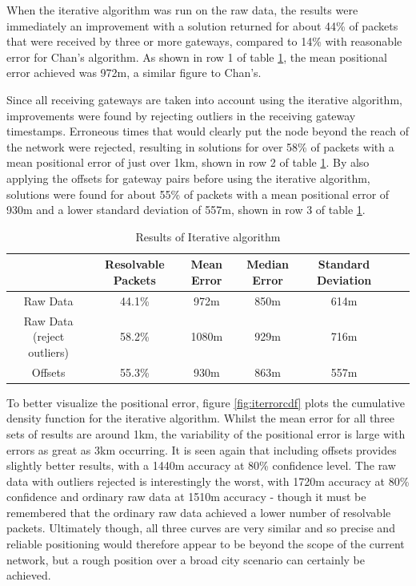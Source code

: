 \documentclass[a4paper]{report}
\begin{document}
    When the iterative algorithm was run on the raw data, the results were immediately an improvement with a solution returned for about 44\% of packets that were received by three or more gateways, compared to 14\% with reasonable error for Chan's algorithm. As shown in row 1 of table \ref{tab:iterresults}, the mean positional error achieved was 972m, a similar figure to Chan's.

    Since all receiving gateways are taken into account using the iterative algorithm, improvements were found by rejecting outliers in the receiving gateway timestamps. Erroneous times that would clearly put the node beyond the reach of the network were rejected, resulting in solutions for over 58\% of packets with a mean positional error of just over 1km, shown in row 2 of table \ref{tab:iterresults}. By also applying the offsets for gateway pairs before using the iterative algorithm, solutions were found for about 55\% of packets with a mean positional error of 930m and a lower standard deviation of 557m, shown in row 3 of table \ref{tab:iterresults}.

    \begin{table}[ht]
      \begin{center}
        \caption{Results of Iterative algorithm}
        \label{tab:iterresults}
        \begin{tabular}{|c|c|c|c|c|c|c|}
          \hline
           & Resolvable Packets & Mean Error & Median Error & Standard Deviation \\
          \hline
          Raw Data & 44.1\% & 972m & 850m & 614m \\
          \hline
          Raw Data (reject outliers) & 58.2\% & 1080m & 929m & 716m \\
          \hline
          Offsets & 55.3\% & 930m & 863m & 557m \\
          \hline
        \end{tabular}
      \end{center}
    \end{table}

    To better visualize the positional error, figure \ref{fig:iterrorcdf} plots the cumulative density function for the iterative algorithm. Whilst the mean error for all three sets of results are around 1km, the variability of the positional error is large with errors as great as 3km occurring. It is seen again that including offsets provides slightly better results, with a 1440m accuracy at 80\% confidence level. The raw data with outliers rejected is interestingly the worst, with 1720m accuracy at 80\% confidence and ordinary raw data at 1510m accuracy - though it must be remembered that the ordinary raw data achieved a lower number of resolvable packets. Ultimately though, all three curves are very similar and so precise and reliable positioning would therefore appear to be beyond the scope of the current network, but a rough position over a broad city scenario can certainly be achieved.
\end{document}
